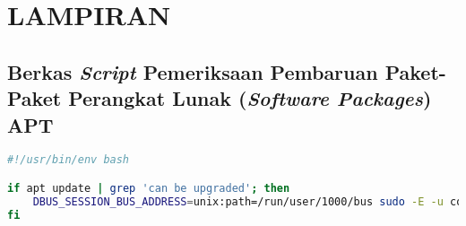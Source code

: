 \chapter*{LAMPIRAN}

\section{Berkas \textit{Script} Pemeriksaan Pembaruan Paket-Paket Perangkat Lunak (\textit{Software Packages}) APT}

\begin{lstlisting}[language=bash]
#!/usr/bin/env bash

if apt update | grep 'can be upgraded'; then
    DBUS_SESSION_BUS_ADDRESS=unix:path=/run/user/1000/bus sudo -E -u comfyte notify-send 'APT updates available!' 'Several packages need to be updated' >> /tmp/farrel-apt-update-notifier-log.txt 2>&1
fi
\end{lstlisting}
